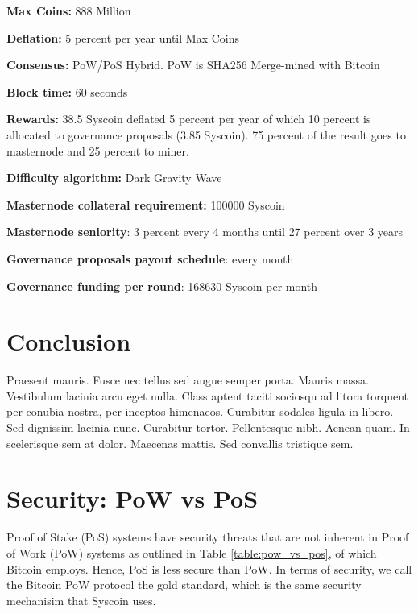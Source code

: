 \documentclass[peerreview]{ieeesyscoin}
\begin{document}
\begin{description}[font=$\bullet$~\normalfont\scshape\color{blue!50!black}]
\item \textbf{Max Coins:} 888 Million
\item \textbf{Deflation:}  5 percent per year until Max Coins
\item \textbf{Consensus:} PoW/PoS Hybrid. PoW is SHA256
Merge-mined with Bitcoin
\item \textbf{Block time:} 60 seconds 
\item \textbf{Rewards:} 38.5 Syscoin deflated 5 percent per year
of which 10 percent is allocated to governance proposals (3.85 Syscoin). 75 percent of the result goes
to masternode and 25 percent to miner.
\item \textbf{Difficulty algorithm:} Dark Gravity Wave
\item \textbf{Masternode collateral requirement:} 100000 Syscoin
\item \textbf{Masternode seniority}: 3 percent every 4 months until
27 percent over 3 years
\item \textbf{Governance proposals payout schedule}: every month
\item \textbf{Governance funding per round}: 168630 Syscoin per
month
\end{description}


\section{Conclusion}
\label{section:conclusion}
Praesent mauris. Fusce nec tellus sed augue semper porta. Mauris massa. Vestibulum lacinia arcu eget nulla. Class aptent taciti sociosqu ad litora torquent per conubia nostra, per inceptos himenaeos. Curabitur sodales ligula in libero. Sed dignissim lacinia nunc. Curabitur tortor. Pellentesque nibh. Aenean quam. In scelerisque sem at dolor. Maecenas mattis. Sed convallis tristique sem. 

\appendices

\section{Security: PoW vs PoS}

Proof of Stake (PoS) systems have security threats that are not inherent in Proof of Work (PoW) systems as outlined in Table \ref{table:pow_vs_pos}, of which Bitcoin employs. Hence, PoS is less secure than PoW. In terms of security, we call the Bitcoin PoW protocol the gold standard, which is the same security mechanisim that Syscoin uses.
\end{document}
